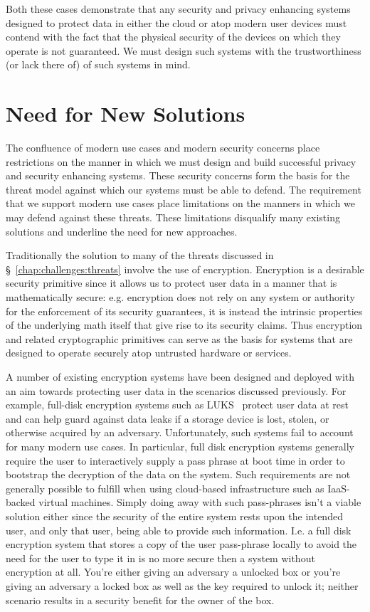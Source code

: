 Both these cases demonstrate that any security and privacy enhancing
systems designed to protect data in either the cloud or atop modern
user devices must contend with the fact that the physical security of
the devices on which they operate is not guaranteed. We must design
such systems with the trustworthiness (or lack there of) of such
systems in mind.

\section{Need for New Solutions}
\label{chap:challenges:solutions}

The confluence of modern use cases and modern security concerns place
restrictions on the manner in which we must design and build
successful privacy and security enhancing systems. These security
concerns form the basis for the threat model against which our systems
must be able to defend. The requirement that we support modern use
cases place limitations on the manners in which we may defend against
these threats. These limitations disqualify many existing solutions
and underline the need for new approaches.

Traditionally the solution to many of the threats discussed in
\S~\ref{chap:challenges:threats} involve the use of
encryption. Encryption is a desirable security primitive since it
allows us to protect user data in a manner that is mathematically
secure: e.g. encryption does not rely on any system or authority for
the enforcement of its security guarantees, it is instead the
intrinsic properties of the underlying math itself that give rise to
its security claims. Thus encryption and related cryptographic
primitives can serve as the basis for systems that are designed to
operate securely atop untrusted hardware or services.

A number of existing encryption systems have been designed and
deployed with an aim towards protecting user data in the scenarios
discussed previously. For example, full-disk encryption systems such
as LUKS~\cite{luks} protect user data at rest and can help guard
against data leaks if a storage device is lost, stolen, or otherwise
acquired by an adversary. Unfortunately, such systems fail to account
for many modern use cases. In particular, full disk encryption systems
generally require the user to interactively supply a pass phrase at
boot time in order to bootstrap the decryption of the data on the
system. Such requirements are not generally possible to fulfill when
using cloud-based infrastructure such as IaaS-backed virtual
machines. Simply doing away with such pass-phrases isn't a viable
solution either since the security of the entire system rests upon the
intended user, and only that user, being able to provide such
information. I.e. a full disk encryption system that stores a copy of
the user pass-phrase locally to avoid the need for the user to type it
in is no more secure then a system without encryption at all. You're
either giving an adversary a unlocked box or you're giving an
adversary a locked box as well as the key required to unlock it;
neither scenario results in a security benefit for the owner of the
box.

